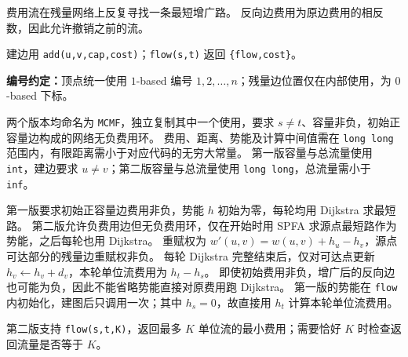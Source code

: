 费用流在残量网络上反复寻找一条最短增广路。
反向边费用为原边费用的相反数，因此允许撤销之前的流。

建边用 \texttt{add(u,v,cap,cost)}；\texttt{flow(s,t)} 返回 \texttt{\{flow,cost\}}。

\textbf{编号约定：}顶点统一使用 $1$-based 编号 $1,2,\ldots,n$；残量边位置仅在内部使用，为 $0$-based 下标。

两个版本均命名为 \texttt{MCMF}，独立复制其中一个使用，要求 $s\ne t$、容量非负，初始正容量边构成的网络无负费用环。
费用、距离、势能及计算中间值需在 \texttt{long long} 范围内，有限距离需小于对应代码的无穷大常量。
第一版容量与总流量使用 \texttt{int}，建边要求 $u\ne v$；第二版容量与总流量使用 \texttt{long long}，总流量需小于 \texttt{inf}。

第一版要求初始正容量边费用非负，势能 $h$ 初始为零，每轮均用 Dijkstra 求最短路。
第二版允许负费用边但无负费用环，仅在开始时用 SPFA 求源点最短路作为势能，之后每轮也用 Dijkstra。
重赋权为 $w'(u,v)=w(u,v)+h_u-h_v$，源点可达部分的残量边重赋权非负。
每轮 Dijkstra 完整结束后，仅对可达点更新 $h_v\gets h_v+d_v$，本轮单位流费用为 $h_t-h_s$。
即使初始费用非负，增广后的反向边也可能为负，因此不能省略势能直接对原费用跑 Dijkstra。
第一版的势能在 \texttt{flow} 内初始化，建图后只调用一次；其中 $h_s=0$，故直接用 $h_t$ 计算本轮单位流费用。

第二版支持 \texttt{flow(s,t,K)}，返回最多 $K$ 单位流的最小费用；需要恰好 $K$ 时检查返回流量是否等于 $K$。
